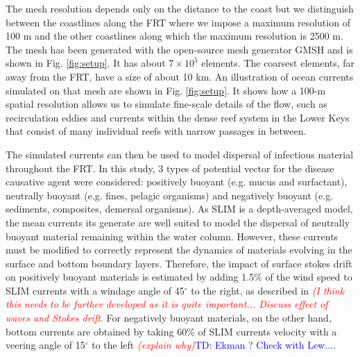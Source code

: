 \documentclass[utf8]{frontiersSCNS}
\newcommand{\emphc}[1]{\emph{\textcolor{red}{#1}}}
\begin{document}
The mesh resolution depends only on the distance to the coast but we distinguish between the coastlines along the FRT where we impose a maximum resolution of 100 m and the other coastlines along which the maximum resolution is 2500 m. The mesh has been generated with the open-source mesh generator GMSH \citep{Geuzaine2009} and is shown in Fig. \ref{fig:setup}. It has about $7 \times 10^5$ elements. The coarsest elements, far away from the FRT, have a size of about 10 km. An illustration of ocean currents simulated on that mesh are shown in Fig. \ref{fig:setup}. It shows how a 100-m spatial resolution allows us to simulate fine-scale details of the flow, such as recirculation eddies and currents within the dense reef system in the Lower Keys that consist of many individual reefs with narrow passages in between. 

The simulated currents can then be used to model dispersal of infectious material throughout the FRT. In this study, 3 types of potential vector for the disease causative agent were considered: positively buoyant (e.g. mucus and surfactant), neutrally buoyant (e.g. fines, pelagic organisms) and negatively buoyant (e.g. sediments, composites, demersal organisms). As SLIM is a depth-averaged model, the mean currents its generate are well suited to model the dispersal of neutrally buoyant material remaining within the water column. However, these currents must be modified to correctly represent the dynamics of materials evolving in the surface and bottom boundary layers. Therefore, the impact of surface stokes drift on positively buoyant materials is estimated by adding 1.5\% of the wind speed to SLIM currents with a windage angle of 45$^\circ$ to the right, as described in \citep{ardhuin2009observation} \emphc{(I think this needs to be further developed as it is quite important... Discuss effect of waves and Stokes drift}. For negatively buoyant materials, on the other hand, bottom currents are obtained by taking 60\% of SLIM currents velocity with a veering angle of 15$^\circ$ to the left \emphc{(explain why)}\textcolor{blue}{TD: Ekman ? Check with Lew...}.
\end{document}
